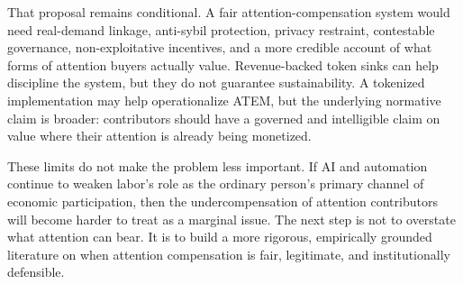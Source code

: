 \documentclass[12pt, a4paper]{article}
\begin{document}
That proposal remains conditional. A fair attention-compensation system would need real-demand linkage, anti-sybil protection, privacy restraint, contestable governance, non-exploitative incentives, and a more credible account of what forms of attention buyers actually value. Revenue-backed token sinks can help discipline the system, but they do not guarantee sustainability. A tokenized implementation may help operationalize ATEM, but the underlying normative claim is broader: contributors should have a governed and intelligible claim on value where their attention is already being monetized.

These limits do not make the problem less important. If AI and automation continue to weaken labor's role as the ordinary person's primary channel of economic participation, then the undercompensation of attention contributors will become harder to treat as a marginal issue. The next step is not to overstate what attention can bear. It is to build a more rigorous, empirically grounded literature on when attention compensation is fair, legitimate, and institutionally defensible.





\end{document}
